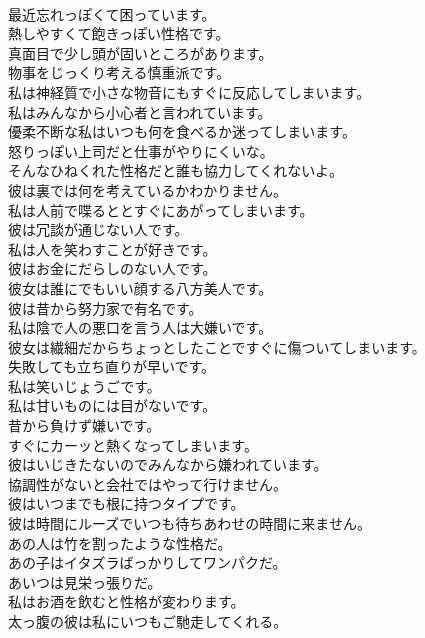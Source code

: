 \documentclass[8pt]{extreport}
\begin{document}
\begin{CJK}{UTF8}{min}
\\	最近忘れっぽくて困っています。	
\\	熱しやすくて飽きっぽい性格です。	
\\	真面目で少し頭が固いところがあります。	
\\	物事をじっくり考える慎重派です。	
\\	私は神経質で小さな物音にもすぐに反応してしまいます。	
\\	私はみんなから小心者と言われています。	
\\	優柔不断な私はいつも何を食べるか迷ってしまいます。	
\\	怒りっぽい上司だと仕事がやりにくいな。	
\\	そんなひねくれた性格だと誰も協力してくれないよ。	
\\	彼は裏では何を考えているかわかりません。	
\\	私は人前で喋るととすぐにあがってしまいます。	
\\	彼は冗談が通じない人です。	
\\	私は人を笑わすことが好きです。	
\\	彼はお金にだらしのない人です。	
\\	彼女は誰にでもいい顔する八方美人です。	
\\	彼は昔から努力家で有名です。	
\\	私は陰で人の悪口を言う人は大嫌いです。	
\\	彼女は繊細だからちょっとしたことですぐに傷ついてしまいます。	
\\	失敗しても立ち直りが早いです。	
\\	私は笑いじょうごです。	
\\	私は甘いものには目がないです。	
\\	昔から負けず嫌いです。	
\\	すぐにカーッと熱くなってしまいます。	
\\	彼はいじきたないのでみんなから嫌われています。	
\\	協調性がないと会社ではやって行けません。	
\\	彼はいつまでも根に持つタイプです。	
\\	彼は時間にルーズでいつも待ちあわせの時間に来ません。	
\\	あの人は竹を割ったような性格だ。	
\\	あの子はイタズラばっかりしてワンパクだ。	
\\	あいつは見栄っ張りだ。	
\\	私はお酒を飲むと性格が変わります。	
\\	太っ腹の彼は私にいつもご馳走してくれる。	

\end{CJK}
\end{document}
